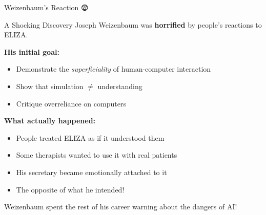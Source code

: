 \documentclass[aspectratio=169]{beamer}
\begin{document}
\begin{frame}[shrink=10]{Weizenbaum's Reaction 😨}
\small
\begin{alertblock}{A Shocking Discovery}
Joseph Weizenbaum was \textbf{horrified} by people's reactions to ELIZA.
\end{alertblock}

\vspace{0.3cm}

\textbf{His initial goal:}
\begin{itemize}\setlength{\itemsep}{0pt}
    \item Demonstrate the \textit{superficiality} of human-computer interaction
    \item Show that simulation $\neq$ understanding
    \item Critique overreliance on computers
\end{itemize}

\vspace{0.3cm}

\textbf{What actually happened:}
\begin{itemize}\setlength{\itemsep}{0pt}
    \item People treated ELIZA as if it understood them
    \item Some therapists wanted to use it with real patients
    \item His secretary became emotionally attached to it
    \item The opposite of what he intended!
\end{itemize}

\vspace{0.3cm}

\begin{thinkaboutit}
Weizenbaum spent the rest of his career warning about the dangers of AI!
\end{thinkaboutit}
\end{frame}
\end{document}
